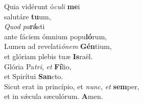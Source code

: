 \evenverse Quia vidérunt ó\textit{cu}\textit{li} \textbf{me}i~\*\\
\evenverse salutáre \textbf{tu}um,\\
\oddverse \textit{Quod} \textit{pa}\textbf{rá}sti~\*\\
\oddverse ante fáciem ómnium popu\textbf{ló}rum,\\
\evenverse Lumen ad revelati\textit{ó}\textit{nem} \textbf{Gén}tium,~\*\\
\evenverse et glóriam plebis tuæ \textbf{Is}raël.\\
\oddverse Glória Pa\textit{tri}, \textit{et} \textbf{Fí}lio,~\*\\
\oddverse et Spirítui \textbf{San}cto.\\
\evenverse Sicut erat in princípio, et \textit{nunc}, \textit{et} \textbf{sem}per,~\*\\
\evenverse et in sǽcula sæculórum. \textbf{A}men.\\
